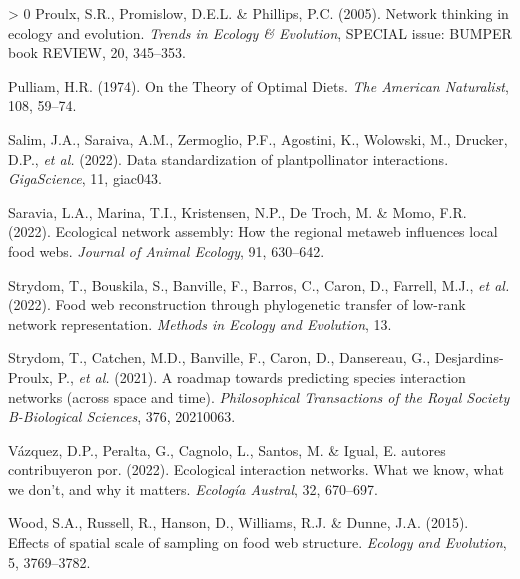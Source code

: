 \documentclass[10pt,oneside]{article}
\newlength{\cslhangindent}
\newenvironment{CSLReferences}[3] %
 {%
  \setlength{\parindent}{0pt}
  \ifodd #1 \everypar{\setlength{\hangindent}{\cslhangindent}}\ignorespaces\fi
  \ifnum #2 > 0
  \setlength{\parskip}{#2\baselineskip}
  \fi
 }%
 {}
\begin{document}
\begin{CSLReferences}{1}{0}
\leavevmode\hypertarget{ref-Proulx2005Networka}{}%
Proulx, S.R., Promislow, D.E.L. \& Phillips, P.C. (2005). Network
thinking in ecology and evolution. \emph{Trends in Ecology \&
Evolution}, SPECIAL issue: BUMPER book REVIEW, 20, 345--353.

\leavevmode\hypertarget{ref-Pulliam1974Theory}{}%
Pulliam, H.R. (1974). On the Theory of Optimal Diets. \emph{The American
Naturalist}, 108, 59--74.

\leavevmode\hypertarget{ref-Salim2022DatSta}{}%
Salim, J.A., Saraiva, A.M., Zermoglio, P.F., Agostini, K., Wolowski, M.,
Drucker, D.P., \emph{et al.} (2022). Data standardization of
plantpollinator interactions. \emph{GigaScience}, 11, giac043.

\leavevmode\hypertarget{ref-Saravia2022Ecological}{}%
Saravia, L.A., Marina, T.I., Kristensen, N.P., De Troch, M. \& Momo,
F.R. (2022). Ecological network assembly: How the regional metaweb
influences local food webs. \emph{Journal of Animal Ecology}, 91,
630--642.

\leavevmode\hypertarget{ref-Strydom2022Food}{}%
Strydom, T., Bouskila, S., Banville, F., Barros, C., Caron, D., Farrell,
M.J., \emph{et al.} (2022). Food web reconstruction through phylogenetic
transfer of low-rank network representation. \emph{Methods in Ecology
and Evolution}, 13.

\leavevmode\hypertarget{ref-Strydom2021Roadmapa}{}%
Strydom, T., Catchen, M.D., Banville, F., Caron, D., Dansereau, G.,
Desjardins-Proulx, P., \emph{et al.} (2021). A roadmap towards
predicting species interaction networks (across space and time).
\emph{Philosophical Transactions of the Royal Society B-Biological
Sciences}, 376, 20210063.

\leavevmode\hypertarget{ref-VazquezSS2022EcoInt}{}%
Vázquez, D.P., Peralta, G., Cagnolo, L., Santos, M. \& Igual, E. autores
contribuyeron por. (2022). Ecological interaction networks. What we
know, what we don't, and why it matters. \emph{Ecología Austral}, 32,
670--697.

\leavevmode\hypertarget{ref-Wood2015Effects}{}%
Wood, S.A., Russell, R., Hanson, D., Williams, R.J. \& Dunne, J.A.
(2015). Effects of spatial scale of sampling on food web structure.
\emph{Ecology and Evolution}, 5, 3769--3782.

\end{CSLReferences}
\end{document}

